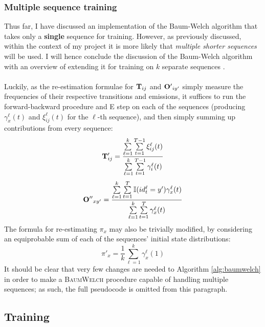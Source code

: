 \documentclass[12pt,a4paper,twoside,openright]{report}
\begin{document}
\subsubsection{Multiple sequence training}
Thus far, I have discussed an implementation of the Baum-Welch algorithm that takes only a \textbf{single} sequence for training. However, as previously discussed, within the context of my project it is more likely that \emph{multiple shorter sequences} will be used. I will hence conclude the discussion of the Baum-Welch algorithm with an overview of extending it for training on $k$ separate sequences \cite{rabiner1989tutorial}.\\ \\
Luckily, as the re-estimation formulae for ${\bf T}_{ij}$ and ${\bf O'}_{iy'}$ simply measure the frequencies of their respective transitions and emissions, it suffices to run the forward-backward procedure and E step on each of the sequences (producing $\gamma_x^\ell(t)$ and $\xi_{ij}^\ell(t)$ for the $\ell$-th sequence), and then simply summing up contributions from every sequence:
\[{\bf T}'_{ij} = \frac{\sum\limits_{\ell=1}^k\sum\limits_{t=1}^{T-1}{\xi_{ij}^\ell(t)}}{\sum\limits_{\ell=1}^k\sum\limits_{t=1}^{T-1}{\gamma_i^\ell(t)}}\]
\[{\bf O''}_{xy'} = \frac{\sum\limits_{\ell=1}^k\sum\limits_{t=1}^{T}{\mathbb{I}(id_t^\ell = y')}\gamma_x^\ell(t)}{\sum\limits_{\ell=1}^k\sum\limits_{t=1}^{T}{\gamma_x^\ell(t)}}\]
The formula for re-estimating $\pi_x$ may also be trivially modified, by considering an equiprobable sum of each of the sequences' initial state distributions:
\[\pi'_x = \frac{1}{k}\sum_{\ell=1}^k{\gamma_x^\ell(1)}\]
It should be clear that very few changes are needed to Algorithm \ref{alg:baumwelch} in order to make a \textsc{BaumWelch} procedure capable of handling multiple sequences; as such, the full pseudocode is omitted from this paragraph.

\subsection{Training}\label{secfulltrn}
\end{document}
